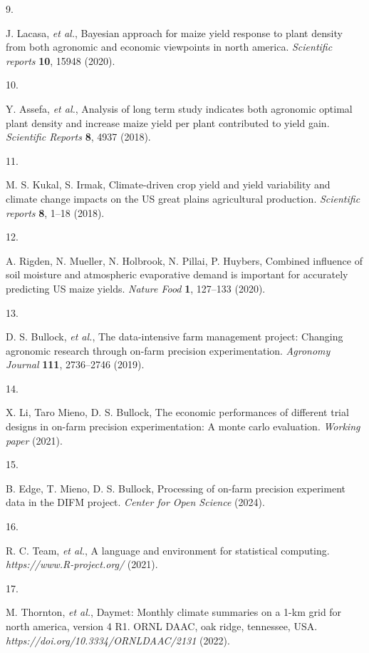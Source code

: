 \documentclass[
]{article}
\newlength{\cslhangindent}
\newlength{\csllabelwidth}
\newenvironment{CSLReferences}[2] %
 {\begin{list}{}{%
  \setlength{\itemindent}{0pt}
  \setlength{\leftmargin}{0pt}
  \setlength{\parsep}{0pt}
  \ifodd #1
   \setlength{\leftmargin}{\cslhangindent}
   \setlength{\itemindent}{-1\cslhangindent}
  \fi
  \setlength{\itemsep}{#2\baselineskip}}}
 {\end{list}}
\newcommand{\CSLLeftMargin}[1]{\parbox[t]{\csllabelwidth}{\strut#1\strut}}
\newcommand{\CSLRightInline}[1]{\parbox[t]{\linewidth - \csllabelwidth}{\strut#1\strut}}
\begin{document}
\begin{CSLReferences}{0}{1}
\CSLLeftMargin{9. }%
\CSLRightInline{J. Lacasa, \emph{et al.}, Bayesian approach for maize
yield response to plant density from both agronomic and economic
viewpoints in north america. \emph{Scientific reports} \textbf{10},
15948 (2020).}

\CSLLeftMargin{10. }%
\CSLRightInline{Y. Assefa, \emph{et al.}, Analysis of long term study
indicates both agronomic optimal plant density and increase maize yield
per plant contributed to yield gain. \emph{Scientific Reports}
\textbf{8}, 4937 (2018).}

\CSLLeftMargin{11. }%
\CSLRightInline{M. S. Kukal, S. Irmak, Climate-driven crop yield and
yield variability and climate change impacts on the US great plains
agricultural production. \emph{Scientific reports} \textbf{8}, 1--18
(2018).}

\CSLLeftMargin{12. }%
\CSLRightInline{A. Rigden, N. Mueller, N. Holbrook, N. Pillai, P.
Huybers, Combined influence of soil moisture and atmospheric evaporative
demand is important for accurately predicting US maize yields.
\emph{Nature Food} \textbf{1}, 127--133 (2020).}

\CSLLeftMargin{13. }%
\CSLRightInline{D. S. Bullock, \emph{et al.}, The data-intensive farm
management project: Changing agronomic research through on-farm
precision experimentation. \emph{Agronomy Journal} \textbf{111},
2736--2746 (2019).}

\CSLLeftMargin{14. }%
\CSLRightInline{X. Li, Taro Mieno, D. S. Bullock, The economic
performances of different trial designs in on-farm precision
experimentation: A monte carlo evaluation. \emph{Working paper} (2021).}

\CSLLeftMargin{15. }%
\CSLRightInline{B. Edge, T. Mieno, D. S. Bullock, Processing of on-farm
precision experiment data in the DIFM project. \emph{Center for Open
Science} (2024).}

\CSLLeftMargin{16. }%
\CSLRightInline{R. C. Team, \emph{et al.}, A language and environment
for statistical computing. \emph{https://www.R-project.org/} (2021).}

\CSLLeftMargin{17. }%
\CSLRightInline{M. Thornton, \emph{et al.}, Daymet: Monthly climate
summaries on a 1-km grid for north america, version 4 R1. ORNL DAAC, oak
ridge, tennessee, USA. \emph{https://doi.org/10.3334/ORNLDAAC/2131}
(2022).}

\end{CSLReferences}
\end{document}

